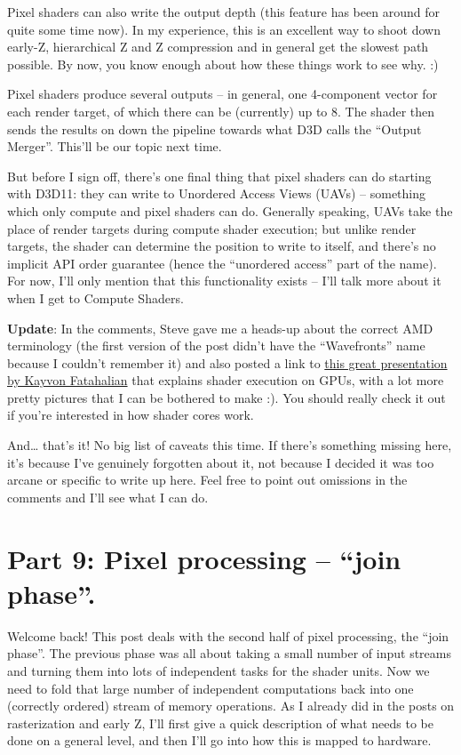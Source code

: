 \documentclass[12pt]{article}
\begin{document}
Pixel shaders can also write the output depth (this feature has been around for quite some time now). In my experience, this is an excellent way to shoot down early-Z, hierarchical Z and Z compression and in general get the slowest path possible. By now, you know enough about how these things work to see why. :)

Pixel shaders produce several outputs – in general, one 4-component vector for each render target, of which there can be (currently) up to 8. The shader then sends the results on down the pipeline towards what D3D calls the “Output Merger”. This’ll be our topic next time.

But before I sign off, there’s one final thing that pixel shaders can do starting with D3D11: they can write to Unordered Access Views (UAVs) – something which only compute and pixel shaders can do. Generally speaking, UAVs take the place of render targets during compute shader execution; but unlike render targets, the shader can determine the position to write to itself, and there’s no implicit API order guarantee (hence the “unordered access” part of the name). For now, I’ll only mention that this functionality exists – I’ll talk more about it when I get to Compute Shaders.

\textbf{\textbf{Update}}: In the comments, Steve gave me a heads-up about the correct AMD terminology (the first version of the post didn’t have the “Wavefronts” name because I couldn’t remember it) and also posted a link to \href{http://bps10.idav.ucdavis.edu/talks/03-fatahalian\_gpuArchTeraflop\_BPS\_SIGGRAPH2010.pdf}{this great presentation by Kayvon Fatahalian} that explains shader execution on GPUs, with a lot more pretty pictures that I can be bothered to make :). You should really check it out if you’re interested in how shader cores work.

And… that’s it! No big list of caveats this time. If there’s something missing here, it’s because I’ve genuinely forgotten about it, not because I decided it was too arcane or specific to write up here. Feel free to point out omissions in the comments and I’ll see what I can do.

\section{Part 9: Pixel processing – “join phase”.}
\label{sec:org547b7d8}
\label{part9}

Welcome back! This post deals with the second half of pixel processing, the “join phase”. The previous phase was all about taking a small number of input streams and turning them into lots of independent tasks for the shader units. Now we need to fold that large number of independent computations back into one (correctly ordered) stream of memory operations. As I already did in the posts on rasterization and early Z, I’ll first give a quick description of what needs to be done on a general level, and then I’ll go into how this is mapped to hardware.
\end{document}
